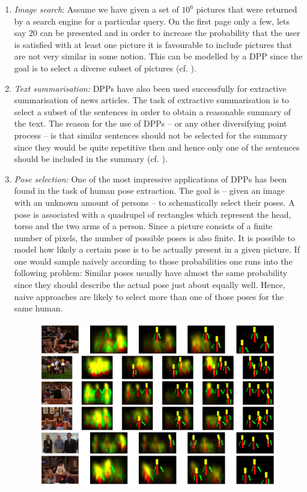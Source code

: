 \begin{enumerate}
\item \emph{Image search}: Assume we have given a set of \(10^6\) pictures that were returned by a search engine for a particular query. On the first page only a few, lets say \(20\) can be presented and in order to increase the probability that the user is satisfied with at least one picture it is favourable to include pictures that are not very similar in some notion. This can be modelled by a DPP since the goal is to select a diverse subset of pictures (cf. \cite{kulesza2011k}). %
\item \emph{Text summarisation:} DPPs have also been used successfully for extractive summarisation of news articles. The task of extractive summarisation is to select a subset of the sentences in order to obtain a reasonable summary of the text. The reason for the use of DPPs -- or any other diversifying point process -- is that similar sentences should not be selected for the summary since they would be quite repetitive then and hence only one of the sentences should be included in the summary (cf. \cite{kulesza2012learning1}). 
\item \emph{Pose selection:} One of the most impressive applications of DPPs has been found in the task of human pose extraction. The goal is -- given an image with an unknown amount of persons -- to schematically select their poses. A pose is associated with a quadrupel of rectangles which represent the head, torso and the two arms of a person. Since a picture consists of a finite number of pixels, the number of possible poses is also finite. It is possible to model how likely a certain pose is to be actually present in a given picture. If one would sample naively according to those probabilities one runs into the following problem: Similar poses usually have almost the same probability since they should describe the actual pose just about equally well. Hence, naive approaches are likely to select more than one of those poses for the same human.
\begin{figure}[h!]
	\centering
	\includegraphics[width=0.99\textwidth]{figures/pose-estimation}

\end{figure}
\end{enumerate}
